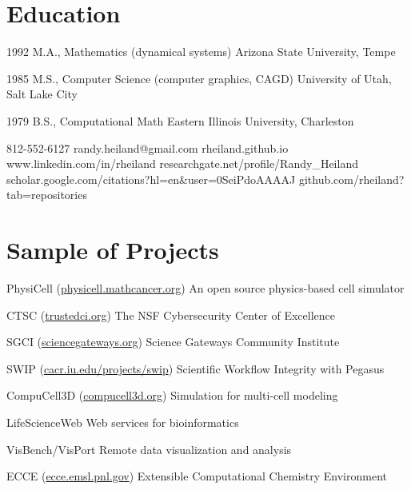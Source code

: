 \documentclass{tccv}
\begin{document}
\section{Education}

\begin{edulist}

\item{1992}
     {M.A., Mathematics}
     {(dynamical systems)}
     {Arizona State University, Tempe}

\item{1985}
     {M.S., Computer Science}
     {(computer graphics, CAGD)}
     {University of Utah, Salt Lake City}

\item{1979}
     {B.S., Computational Math}
     {Eastern Illinois University, Charleston}
     {}

\end{edulist}

\personal
    {812-552-6127}
    {randy.heiland@gmail.com}
    {rheiland.github.io}
    {www.linkedin.com/in/rheiland}
    {researchgate.net/profile/Randy\_Heiland}
    {scholar.google.com/citations?hl=en\&user=0SeiPdoAAAAJ}
    {github.com/rheiland?tab=repositories}


\section{Sample of Projects}

\begin{projlist}
	\item{}
	{PhysiCell (\href{http://physicell.mathcancer.org}{physicell.mathcancer.org})}
	{An open source physics-based cell simulator}
\item{}
     {CTSC (\href{http://trustedci.org}{trustedci.org})}
     {The NSF Cybersecurity Center of Excellence}
\item{}
     {SGCI (\href{http://sciencegateways.org}{sciencegateways.org})}
     {Science Gateways Community Institute}
\item{}
     {SWIP (\href{https://cacr.iu.edu/projects/swip/index.php}{cacr.iu.edu/projects/swip})}
     {Scientific Workflow Integrity with Pegasus}
\item{}
     {CompuCell3D (\href{http://compucell3d.org}{compucell3d.org})}
     {Simulation for multi-cell modeling}
\item{}
     {LifeScienceWeb}
     {Web services for bioinformatics}
\item{}
     {VisBench/VisPort}
     {Remote data visualization and analysis}
\item{}
     {ECCE (\href{http://ecce.emsl.pnl.gov/}{ecce.emsl.pnl.gov})}
     {Extensible Computational Chemistry Environment}
\end{projlist}
\end{document}
